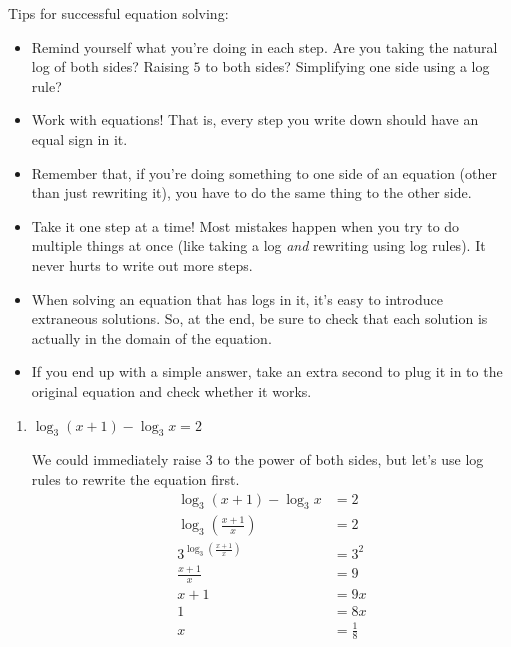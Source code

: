 \documentclass{article}
\begin{document}
\begin{enumerate}[resume]
  \begin{problemonly}
    {\LARGE\Pointinghand} Tips for successful equation solving:
    \begin{itemize}[nosep]
    \item Remind yourself what you're doing in each step. Are you taking the natural log of both sides? Raising $5$ to both sides? Simplifying one side using a log rule?
    \item Work with equations! That is, every step you write down should have an equal sign in it.
    \item Remember that, if you're doing something to one side of an equation (other than just rewriting it), you have to do the same thing to the other side.
    \item Take it one step at a time! Most mistakes happen when you try to do multiple things at once (like taking a log \textit{and} rewriting using log rules). It never hurts to write out more steps.
    \item When solving an equation that has logs in it, it's easy to introduce extraneous solutions. So, at the end, be sure to check that each solution is actually in the domain of the equation.
    \item If you end up with a simple answer, take an extra second to plug it in to the original equation and check whether it works.
    \end{itemize}
  \end{problemonly}

  \pspace{\newpage}

  \begin{enumerate}[resume]
  \item


    \begin{problem}[\stretch{1.25}]
      $\log_3 (x + 1) - \log_3 x = 2$
    \end{problem}

    \begin{solution}
      We could immediately raise $3$ to the power of both sides,
      but let's use log rules to rewrite the equation first.
      \begin{align*}
        \log_3 (x + 1) - \log_3 x &= 2 \\
        \log_3(\tfrac{x+1}{x})&= 2 \\
        3^{\log_3(\tfrac{x+1}{x})} &= 3^2 \\
        \frac{x+1}{x} &= 9 \\
        x+1 &= 9x \\
        1 &= 8x \\
        x &= \boxed{\frac{1}{8}}
      \end{align*}
    \end{solution}


\end{enumerate}
\end{enumerate}
\end{document}
